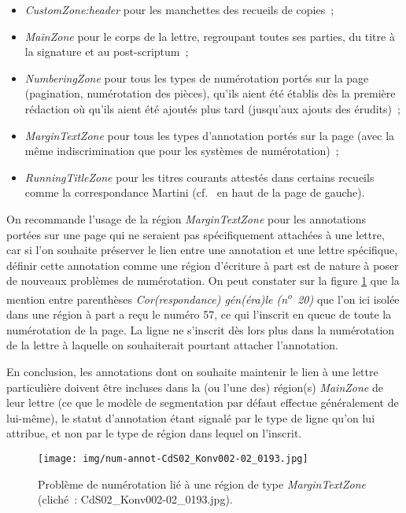 \documentclass[a4paper,12pt,twoside]{book}
\begin{document}
				\begin{itemize}
					\item \textit{CustomZone:header} pour les manchettes des recueils de copies~;
					\item \textit{MainZone} pour le corps de la lettre, regroupant toutes ses parties, du titre à la signature et au post-scriptum~;
					\item \textit{NumberingZone} pour tous les types de numérotation portés sur la page (pagination, numérotation des pièces), qu'ils aient été établis dès la première rédaction où qu'ils aient été ajoutés plus tard (jusqu'aux ajouts des érudits)~;
					\item \textit{MarginTextZone} pour tous les types d'annotation portés sur la page (avec la même indiscrimination que pour les systèmes de numérotation)~;
					\item \textit{RunningTitleZone} pour les titres courants attestés dans certains recueils comme la correspondance Martini (cf.~\cite{CdS19054056} en haut de la page de gauche).
				\end{itemize}
				
				On recommande l'usage de la région \textit{MarginTextZone} pour les annotations portées sur une page qui ne seraient pas spécifiquement attachées à une lettre, car si l'on souhaite préserver le lien entre une annotation et une lettre spécifique, définir cette annotation comme une région d'écriture à part est de nature à poser de nouveaux problèmes de numérotation. On peut constater sur la figure \ref{num-annot-193} que la mention entre parenthèses \textit{Cor(respondance) gén(éra)le (n\textsuperscript{o}~20)} que l'on ici isolée dans une région à part a reçu le numéro 57, ce qui l'inscrit en queue de toute la numérotation de la page. La ligne ne s'inscrit dès lors plus dans la numérotation de la lettre à laquelle on souhaiterait pourtant attacher l'annotation.
				
				En conclusion, les annotations dont on souhaite maintenir le lien à une lettre particulière doivent être incluses dans la (ou l'une des) région(s) \textit{MainZone} de leur lettre (ce que le modèle de segmentation par défaut effectue généralement de lui-même), le statut d'annotation étant signalé par le type de ligne qu'on lui attribue, et non par le type de région dans lequel on l'inscrit.
				
				\begin{figure}[!h]
					\centering
					\texttt{[image: img/num-annot-CdS02\_Konv002-02\_0193.jpg]}
					\caption{Problème de numérotation lié à une région de type \textit{MarginTextZone} (cliché~: CdS02\_Konv002-02\_0193.jpg).}
					\label{num-annot-193}
				\end{figure}
				
\end{document}
